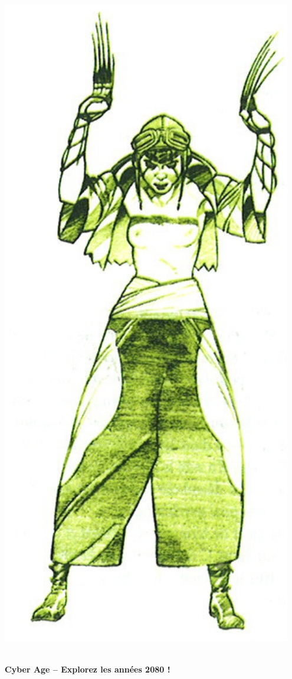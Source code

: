 \documentclass[40pt,twoside,a4paper]{article}
\begin{document}
\begin{minipage}[ht]{0.15\textwidth}
	\includegraphics[width=0.95\textwidth]{img/personnageIrinaToss.jpg} ~\\~\\
\end{minipage} \hfill \begin{minipage}[ht]{0.65\textwidth}
	\textbf{\LARGE Cyber Age -- Explorez les ann{\'e}es 2080 !} ~\\~\\
	

\end{minipage}
\end{document}
